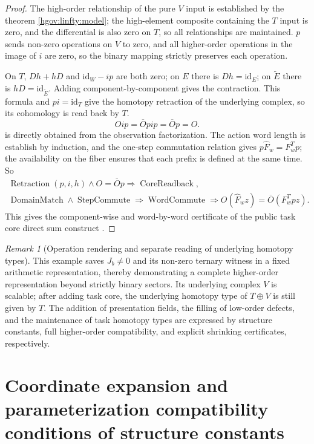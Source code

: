\documentclass[12pt,a4paper,openany,notitlepage]{report}
\theoremstyle{plain}
\theoremstyle{definition}
\theoremstyle{remark}
\newtheorem{remark}[theorem]{Remark}
\begin{document}
\begin{CJK*}
\begin{proof}
The high-order relationship of the pure $V$ input is established by the theorem \ref{hgov:linfty:model}; the high-element composite containing the $T$ input is zero, and the differential is also zero on $T$, so all relationships are maintained. $p$ sends non-zero operations on $V$ to zero, and all higher-order operations in the image of $i$ are zero, so the binary mapping strictly preserves each operation.

On $T$, $Dh+hD$ and $\mathrm{id}_W-ip$ are both zero; on $E$ there is $Dh=\mathrm{id}_E$; on $\widetilde E$ there is $hD=\mathrm{id}_{\widetilde E}$. Adding component-by-component gives the contraction. This formula and $pi=\mathrm{id}_T$ give the homotopy retraction of the underlying complex, so its cohomology is read back by $T$. \[
Oip=\overline O pip=\overline O p=O.
\] is directly obtained from the observation factorization. The action word length is establish by induction, and the one-step commutation relation gives $p\widehat F_w=F_w^Tp$; the availability on the fiber ensures that each prefix is defined at the same time. So \[
\begin{gathered}
\operatorname{Retraction}(p,i,h)\land O=\overline O p
\Rightarrow\operatorname{CoreReadback},\\
\operatorname{DomainMatch}\land\operatorname{StepCommute}
\Rightarrow\operatorname{WordCommute}
\Rightarrow O(\widehat F_w z)=\overline O(F_w^Tpz).
\end{gathered}
\] This gives the component-wise and word-by-word certificate of the public task core direct sum construct \cite{S38}.\end{proof}


\begin{remark}
[Operation rendering and separate reading of underlying homotopy types]\label{hgov:linfty:scope}
This example saves $J_b\ne0$ and its non-zero ternary witness in a fixed arithmetic representation, thereby demonstrating a complete higher-order representation beyond strictly binary sectors. Its underlying complex $V$ is scalable; after adding task core, the underlying homotopy type of $T\oplus V$ is still given by $T$. The addition of presentation fields, the filling of low-order defects, and the maintenance of task homotopy types are expressed by structure constants, full higher-order compatibility, and explicit shrinking certificates, respectively.\end{remark}


\section { Coordinate expansion and parameterization compatibility conditions of structure constants }


\end{CJK*}
\end{document}

